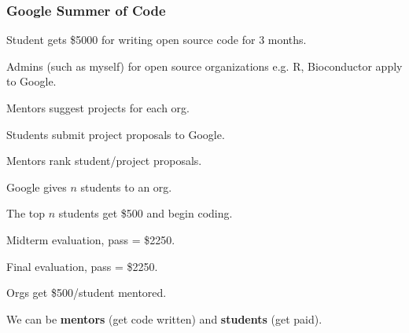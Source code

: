 \documentclass{beamer}
\begin{document}
\begin{frame}
  \frametitle{Google Summer of Code}
Student gets \$5000 for writing open source code for
    3 months.
    \begin{description}
    \item[March] Admins (such as myself) for open source organizations
      e.g. R, Bioconductor apply to Google.
    \item[April] Mentors suggest projects for each org.
    \item[May] Students submit project proposals to Google.
    \item Mentors rank student/project proposals.
    \item Google gives $n$ students to an org.
    \item[June]The top $n$ students get \$500 and begin coding.
    \item[August] Midterm evaluation, pass = \$2250.
    \item[September] Final evaluation, pass = \$2250.
    \item[November] Orgs get \$500/student mentored.
    \end{description}
    We can be \textbf{mentors} (get code written) and
    \textbf{students} (get paid).
\end{frame}
\end{document}
